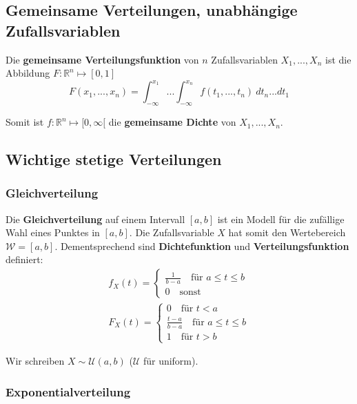 \documentclass[11pt]{article}
\begin{document}
\subsection{Gemeinsame Verteilungen, unabhängige Zufallsvariablen}

Die \textbf{gemeinsame Verteilungsfunktion} von $n$ Zufallsvariablen $X_1,...,X_n$ ist die Abbildung $F: \mathbb{R}^n \mapsto [0,1]$
\begin{equation*}
	F(x_1,...,x_n) = \int_{-\infty}^{x_1} ... \int_{-\infty}^{x_n} f(t_1,...,t_n)\ dt_n...dt_1
\end{equation*}

Somit ist $f: \mathbb{R}^n \mapsto [0, \infty[$ die \textbf{gemeinsame Dichte} von $X_1,...,X_n$.



\subsection{Wichtige stetige Verteilungen}

\subsubsection{Gleichverteilung}

Die \textbf{Gleichverteilung} auf einem Intervall $[a,b]$ ist ein Modell für die zufällige Wahl eines Punktes in $[a,b]$. Die Zufallsvariable $X$ hat somit den Wertebereich $\mathcal{W} = [a,b]$. Dementsprechend sind \textbf{Dichtefunktion} und \textbf{Verteilungsfunktion} definiert:
\begin{equation*}
\begin{split}
	f_X(t) = \begin{cases}
		\frac{1}{b-a}\quad\text{für }a\leq t \leq b \\
		0\quad\text{sonst }
	\end{cases} \\
	F_X(t) = \begin{cases}
		0\quad\text{für } t < a \\
		\frac{t-a}{b-a}\quad\text{für } a \leq t \leq b \\
		1\quad\text{für } t > b
	\end{cases}
\end{split}
\end{equation*}

Wir schreiben $X \sim \mathcal{U}(a,b)$ ($\mathcal{U}$ für uniform).

\subsubsection{Exponentialverteilung}
\end{document}
